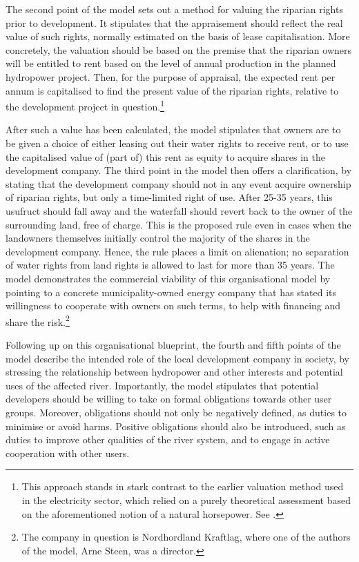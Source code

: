The second point of the model sets out a method for valuing the riparian rights prior to development. It stipulates that the appraisement should reflect the real value of such rights, normally estimated on the basis of lease capitalisation. More concretely, the valuation should be based on the premise that the riparian owners will be entitled to rent based on the level of annual production in the planned hydropower project. Then, for the purpose of appraisal, the expected rent per annum is capitalised to find the present value of the riparian rights, relative to the development project in question.\footnote{This approach stands in stark contrast to the earlier valuation method used in the electricity sector, which relied on a purely theoretical assessment based on the aforementioned notion of a natural horsepower. See \cite{dyrkolbotn15,hellandsfoss97}.}

After such a value has been calculated, the model stipulates that owners are to be given a choice of either leasing out their water rights to receive rent, or to use the capitalised value of (part of) this rent as equity to acquire shares in the development company. The third point in the model then offers a clarification, by stating that the development company should not in any event acquire ownership of riparian rights, but only a time-limited right of use. After 25-35 years, this usufruct should fall away and the waterfall should revert back to the owner of the surrounding land, free of charge. This is the proposed rule even in cases when the landowners themselves initially control the majority of the shares in the development company. Hence, the rule places a limit on alienation; no separation of water rights from land rights is allowed to last for more than 35 years. The model demonstrates the commercial viability of this organisational model by pointing to a concrete municipality-owned energy company that has stated its willingness to cooperate with owners on such terms, to help with financing and share the risk.\footnote{The company in question is Nordhordland Kraftlag, where one of the authors of the model, Arne Steen, was a director.} 

Following up on this organisational blueprint, the fourth and fifth points of the model describe the intended role of the local development company in society, by stressing the relationship between hydropower and other interests and potential uses of the affected river. Importantly, the model stipulates that potential developers should be willing to take on formal obligations towards other user groups. Moreover, obligations should not only be negatively defined, as duties to minimise or avoid harms. Positive obligations should also be introduced, such as duties to improve other qualities of the river system, and to engage in active cooperation with other users. %

